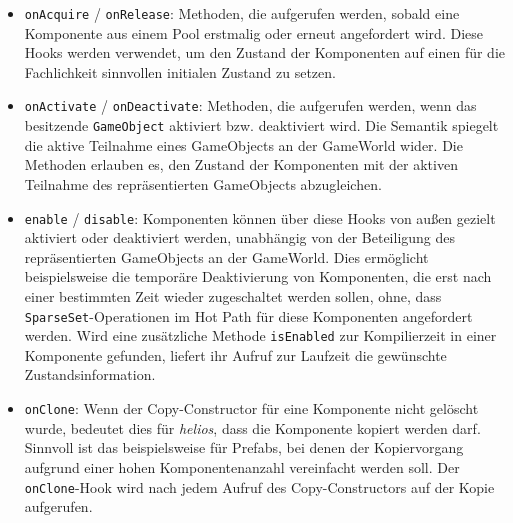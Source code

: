 \begin{itemize}
    \itemsep0.5em
    \item \texttt{onAcquire} / \texttt{onRelease}: Methoden, die aufgerufen werden, sobald eine Komponente aus einem Pool erstmalig oder erneut angefordert wird.
    Diese Hooks werden verwendet, um den Zustand der Komponenten auf einen für die Fachlichkeit sinnvollen initialen Zustand zu setzen.

    \item \texttt{onActivate} / \texttt{onDeactivate}: Methoden, die aufgerufen werden, wenn das besitzende \texttt{GameObject} aktiviert bzw. deaktiviert wird.
    Die Semantik spiegelt die aktive Teilnahme eines GameObjects an der GameWorld wider.
    Die Methoden erlauben es, den Zustand der Komponenten mit der aktiven Teilnahme des repräsentierten GameObjects abzugleichen.

    \item \texttt{enable} / \texttt{disable}: Komponenten können über diese Hooks von außen gezielt aktiviert oder deaktiviert werden, unabhängig von der Beteiligung des repräsentierten GameObjects an der GameWorld.
    Dies ermöglicht beispielsweise die temporäre Deaktivierung von Komponenten, die erst nach einer bestimmten Zeit wieder zugeschaltet werden sollen, ohne, dass \texttt{SparseSet}-Operationen im Hot Path für diese Komponenten angefordert werden.
    Wird eine zusätzliche Methode \texttt{isEnabled} zur Kompilierzeit in einer Komponente gefunden, liefert ihr Aufruf zur Laufzeit die gewünschte Zustandsinformation.

    \item \texttt{onClone}: Wenn der Copy-Constructor für eine Komponente nicht gelöscht wurde, bedeutet dies für \textit{helios}, dass die Komponente kopiert werden darf.
    Sinnvoll ist das beispielsweise für Prefabs, bei denen der Kopiervorgang aufgrund einer hohen Komponentenanzahl vereinfacht werden soll.
    Der \texttt{onClone}-Hook wird nach jedem Aufruf des Copy-Constructors auf der Kopie aufgerufen.
\end{itemize}